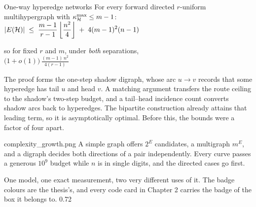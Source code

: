 \documentclass[aspectratio=1610,11pt]{beamer}
\begin{document}
\begin{frame}{One-way hyperedge networks}
\vfill
\centering
{\color{black!45}\small For every forward directed $r$-uniform multihypergraph with $\kappa^{\max}_{\mathcal{H}}\le m-1$:}\\[8pt]
{\color{KULblauw1}\Large $\displaystyle |E(\mathcal{H})| \;\le\; \frac{m-1}{r-1}\left\lfloor \frac{n^2}{4}\right\rfloor \;+\; 4(m-1)^2(n-1)$}

\vspace{18pt}
{\color{black!45}\small so for fixed $r$ and $m$, under \emph{both} separations,}\\[6pt]
{\color{KULblauw1}\Large $\displaystyle \bigl(1+o(1)\bigr)\,\frac{(m-1)\,n^2}{4(r-1)}$}

\vspace{20pt}
\begin{minipage}{0.88\textwidth}
{\footnotesize\color{black!60} The proof forms the one-step shadow digraph, whose arc $u\to v$ records that some hyperedge has tail $u$ and head $v$. A matching argument transfers the route ceiling to the shadow's two-step budget, and a tail--head incidence count converts shadow arcs back to hyperedges. The bipartite construction already attains that leading term, so it is asymptotically optimal. Before this, the bounds were a factor of four apart.}
\end{minipage}
\vfill
\end{frame}


  {complexity_growth.png}
  {A simple graph offers $2^{E}$ candidates, a multigraph $m^{E}$, and a digraph decides both directions of a pair independently. Every curve passes a generous $10^9$ budget while $n$ is in single digits, and the directed cases go first.}

  {\figspine}
  {One model, one exact measurement, two very different uses of it. The badge colours are the thesis's, and every code card in Chapter 2 carries the badge of the box it belongs to.}
  {0.72}
\end{document}
